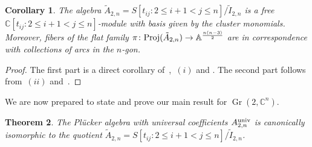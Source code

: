 \documentclass[pdftex]{sigma}%
\newtheorem{Theorem}{Theorem}[section]
\newtheorem{Corollary}[Theorem]{Corollary}
\numberwithin{equation}{section}
\DeclareMathOperator{\Gr}{Gr}
\begin{document}
\begin{Corollary}
The algebra $\tilde A_{2,n}=S[t_{ij}\colon 2\le i+1<j\le n]/\tilde I_{2,n}$ is a free $\mathbb C[t_{ij}\colon 2\le i+1<j\le n]$-module with basis given by the cluster monomials.
Moreover, fibers of the flat family $\pi\colon {\rm Proj}(\tilde A_{2,n})\to \mathbb A^{\frac{n(n-3)}{2}}$ are in correspondence with collections of arcs in the $n$-gon.
\end{Corollary}

\begin{proof}
The first part is a direct corollary of~,~$(i)$ and
.
The second part follows from~$(ii)$ and~.
\end{proof}

We are now prepared to state and prove our main result for $\Gr(2,\mathbb C^n)$.

\begin{Theorem}
The Pl\"ucker algebra with universal coefficients $A_{2,n}^{\rm univ}$ is canonically isomorphic to the quotient $\tilde A_{2,n}=S[t_{ij}\colon 2\le i+1<j\le n]/\tilde I_{2,n}$.
\end{Theorem}
\end{document}
